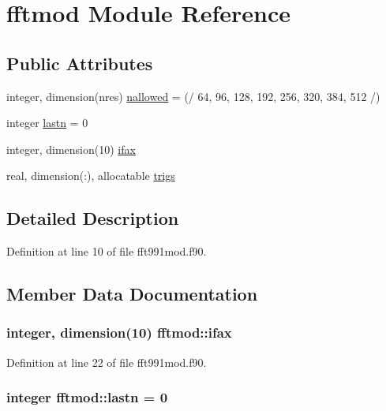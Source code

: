 \hypertarget{classfftmod}{
\section{fftmod \-Module \-Reference}
\label{classfftmod}
}
\subsection*{\-Public \-Attributes}
\begin{DoxyCompactItemize}
\item 
integer, dimension(nres) \hyperlink{classfftmod_a6d025a16cb8a864a12a875409fa6cc5b}{nallowed} = (/ 64, 96, 128, 192, 256, 320, 384, 512 /)
\item 
integer \hyperlink{classfftmod_a23a4e596501c593aa5cccdd3009dd6e9}{lastn} = 0
\item 
integer, dimension(10) \hyperlink{classfftmod_a1d920757f133f3f5fe62c647f0313e6a}{ifax}
\item 
real, dimension(\-:), allocatable \hyperlink{classfftmod_ab67bfe78645c286a8d39d9b8fd10ce0a}{trigs}
\end{DoxyCompactItemize}


\subsection{\-Detailed \-Description}


\-Definition at line 10 of file fft991mod.\-f90.



\subsection{\-Member \-Data \-Documentation}
\hypertarget{classfftmod_a1d920757f133f3f5fe62c647f0313e6a}{
\subsubsection[{ifax}]{\setlength{\rightskip}{0pt plus 5cm}integer, dimension(10) {\bf fftmod\-::ifax}}}
\label{classfftmod_a1d920757f133f3f5fe62c647f0313e6a}


\-Definition at line 22 of file fft991mod.\-f90.

\hypertarget{classfftmod_a23a4e596501c593aa5cccdd3009dd6e9}{
\subsubsection[{lastn}]{\setlength{\rightskip}{0pt plus 5cm}integer {\bf fftmod\-::lastn} = 0}}
\label{classfftmod_a23a4e596501c593aa5cccdd3009dd6e9}


